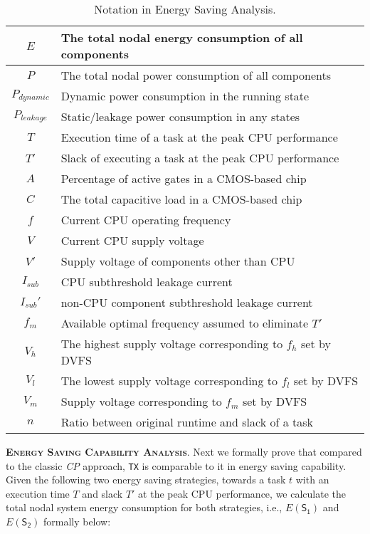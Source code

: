 \documentclass[12pt]{elsarticle}
\begin{document}
\begin{table}\small \centering
\caption{Notation in Energy Saving Analysis.}\label{notation2}
\begin{tabular}{|c|l|}
\hline
$E$ & The total nodal energy consumption of all components\\\hline
$P$ & The total nodal power consumption of all components\\\hline
$P_{dynamic}$ & Dynamic power consumption in the running state\\\hline
$P_{leakage}$ & Static/leakage power consumption in any states\\
\hline
$T$ & Execution time of a task at the peak CPU performance\\
\hline
$T'$ & Slack of executing a task at the peak CPU performance\\
\hline
$A$ & Percentage of active gates in a CMOS-based chip\\
\hline
$C$ & The total capacitive load in a CMOS-based chip\\
\hline
$f$ & Current CPU operating frequency\\
\hline
$V$ & Current CPU supply voltage\\
\hline
$V'$ & Supply voltage of components other than CPU\\
\hline
$I_{sub}$ & CPU subthreshold leakage current\\
\hline
$I_{sub}'$ & non-CPU component subthreshold leakage current\\
\hline
$f_m$ & Available optimal frequency assumed to eliminate $T'$\\\hline
$V_h$ & The highest supply voltage corresponding to $f_h$ set by DVFS\\
\hline
$V_l$ & The lowest supply voltage corresponding to $f_l$ set by DVFS\\
\hline
$V_m$ & Supply voltage corresponding to $f_m$ set by DVFS\\\hline
$n$ & Ratio between original runtime and slack of a task\\\hline
\end{tabular}
\normalsize
\end{table}



\vspace{1mm}
\noindent\textsc{\textbf{Energy Saving Capability Analysis}}. Next we formally prove that compared to the classic \emph{CP} approach, \texttt{TX} is comparable to it in energy saving capability. Given the following two energy saving strategies, towards a task $t$ with an execution time $T$ and slack $T'$ at the peak CPU performance, we calculate the total nodal system energy consumption for both strategies, i.e., $E(\mathsf{S_1})$ and $E(\mathsf{S_2})$ formally below:
\end{document}
